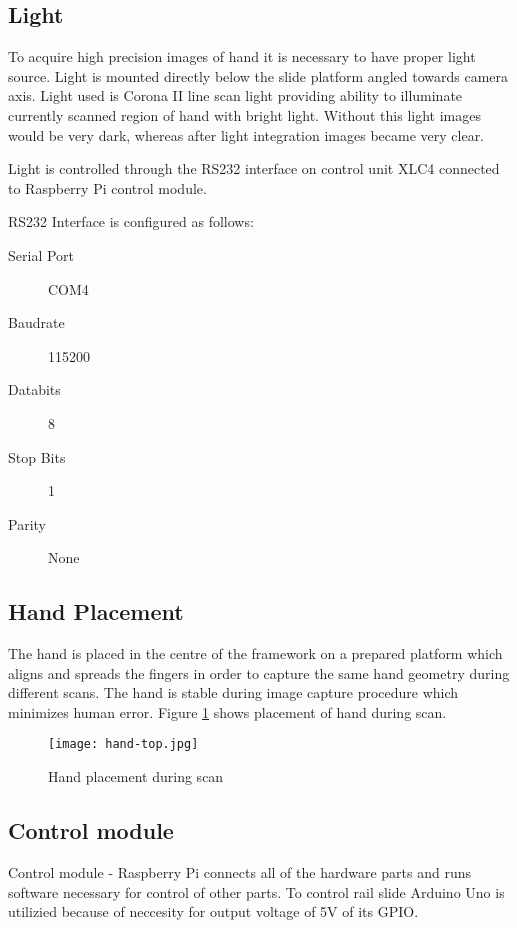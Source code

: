 \subsection{Light}
To acquire high precision images of hand it is necessary to have proper light source. Light is mounted directly below the slide platform
angled towards camera axis. Light used is Corona II line scan light
providing ability to illuminate currently scanned region of hand with bright light. Without this light images would be very
dark, whereas after light integration images became very clear.

Light is controlled through the RS232 interface on control unit XLC4 connected to Raspberry Pi control module.

\noindent RS232 Interface is configured as follows:
\begin{description}
    \item[Serial Port] COM4
    \item[Baudrate] 115200
    \item[Databits] 8
    \item[Stop Bits] 1
    \item[Parity] None
\end{description}

\subsection{Hand Placement}
The hand is placed in the centre of the framework on a prepared platform which aligns and spreads the fingers in order to
capture the same hand geometry during different scans. The hand is stable during image capture procedure which minimizes human error.
Figure \ref{fig:hand-placement} shows placement of hand during scan.

\begin{figure}[ht]
    \label{fig:hand-placement}
    \centering
    \texttt{[image: hand-top.jpg]}
    \caption{Hand placement during scan}
\end{figure}

\subsection{Control module}
Control module - Raspberry Pi connects all of the hardware parts and runs software necessary for control of other parts. To control
rail slide Arduino Uno is utilizied because of neccesity for output voltage of 5V of its GPIO.

